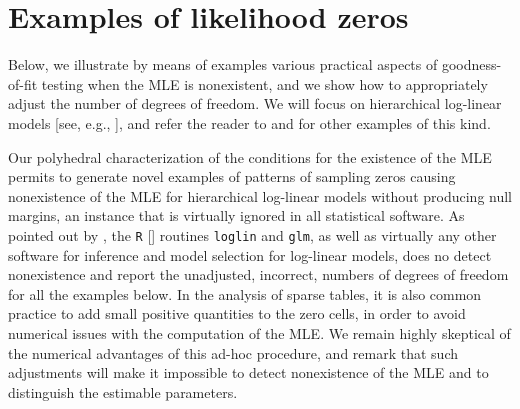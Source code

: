 \documentclass[aos,MSNbibl,nameyear,dvips]{arximspdf}
\begin{document}

\section{Examples of likelihood zeros}

Below, we illustrate by means of examples various practical aspects of
goodness-of-fit testing when the MLE is nonexistent, and we show how to
appropriately adjust the number of degrees of freedom. We will focus on
hierarchical log-linear models [see, e.g., \citet{BFH75}], and refer
the reader to \citet{DFRSZ09} and \citet{NET} for other examples of
this kind.

Our polyhedral characterization of the conditions for the existence of
the MLE permits to generate novel examples of patterns of sampling
zeros causing nonexistence of the MLE for hierarchical log-linear
models without producing null margins, an instance that is virtually
ignored in all statistical software. As pointed out by \citet{ROY05},
the {\tt R} [\citet{R}] routines {\tt loglin} and {\tt glm}, as well as
virtually any other software for inference and model selection for
log-linear models, does no detect nonexistence and report the
unadjusted, incorrect, numbers of degrees of freedom for all the
examples below. In the analysis of sparse tables, it is also common
practice to add small positive quantities to the zero cells, in order
to avoid numerical issues with the computation of the MLE. We remain
highly skeptical of the numerical advantages of this ad-hoc procedure,
and remark that such adjustments will make it impossible to detect
nonexistence of the MLE and to distinguish the estimable parameters.
\end{document}

